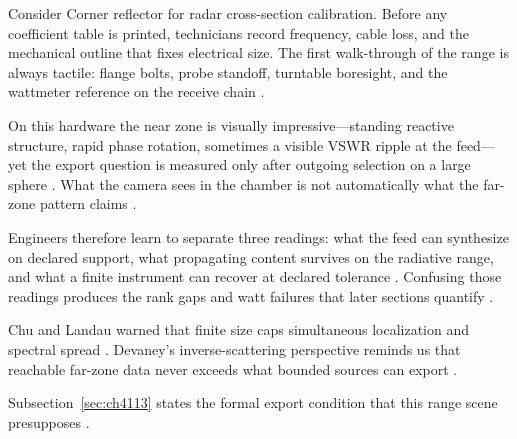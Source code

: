 \begin{physicalvignette}
Consider Corner reflector for radar cross-section calibration. Before any coefficient table is printed, technicians record frequency, cable loss, and the mechanical outline that fixes electrical size. The first walk-through of the range is always tactile: flange bolts, probe standoff, turntable boresight, and the wattmeter reference on the receive chain \cite{hansen1988}.

On this hardware the near zone is visually impressive---standing reactive structure, rapid phase rotation, sometimes a visible VSWR ripple at the feed---yet the export question is measured only after outgoing selection on a large sphere \cite{harrington2001}. What the camera sees in the chamber is not automatically what the far-zone pattern claims \cite{stratton1941}.

Engineers therefore learn to separate three readings: what the feed can synthesize on declared support, what propagating content survives on the radiative range, and what a finite instrument can recover at declared tolerance \cite{devaney2004}. Confusing those readings produces the rank gaps and watt failures that later sections quantify \cite{pal2026}.

Chu and Landau warned that finite size caps simultaneous localization and spectral spread \cite{chu1948}. Devaney's inverse-scattering perspective reminds us that reachable far-zone data never exceeds what bounded sources can export \cite{devaney2004}.

Subsection~\ref{sec:ch4113} states the formal export condition that this range scene presupposes \cite{stratton1941}.
\end{physicalvignette}


